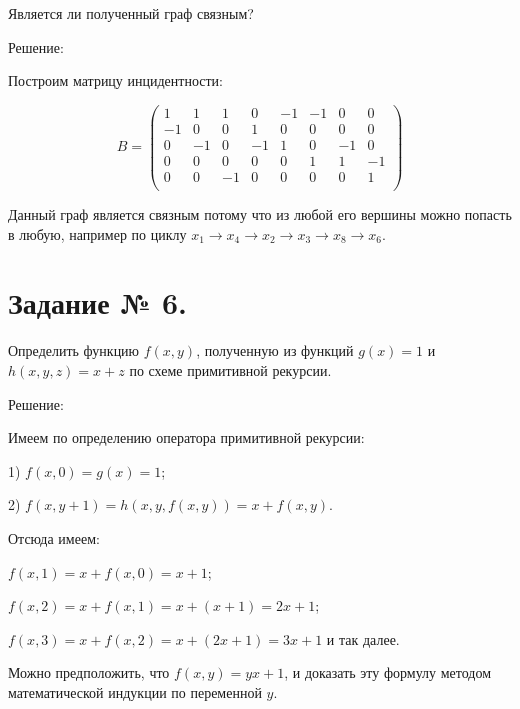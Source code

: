 \documentclass[fleqn]{article}
\begin{document}
Является ли полученный граф связным?

\begin{center}Решение:\end{center}

\medskip
{}
\medskip

Построим матрицу инцидентности:

$$B=
\begin{pmatrix}
1 & 1 & 1 & 0 & -1 & -1 & 0 & 0 \\
-1 & 0 & 0 & 1 & 0 & 0 & 0 & 0 \\
0 & -1 & 0 & -1 & 1 & 0 & -1 & 0 \\
0 & 0 & 0 & 0 & 0 & 1 & 1 & -1 \\
0 & 0 & -1 & 0 & 0 & 0 & 0 & 1 \\
\end{pmatrix}
$$

Данный граф является связным потому что из любой его вершины можно попасть в любую, например по циклу $x_1\to x_4 \to x_2 \to x_3 \to x_8 \to x_6$.

\section*{Задание № 6.}

Определить функцию $f(x,y)$, полученную из функций $g(x) =1$ и
$h(x, y, z) = x+z$ по схеме примитивной рекурсии.

\begin{center}Решение:\end{center}

Имеем по определению оператора примитивной рекурсии:

1) $f(x,0)=g(x)=1$;

2) $f(x,y+1)=h\left(x,y,f(x,y)\right)=x+f(x,y)$.

Отсюда имеем:

$f(x,1)=x+f(x,0)=x+1$;

$f(x,2)=x+f(x,1)=x+(x+1)=2x+1$;

$f(x,3)=x+f(x,2)=x+(2x+1)=3x+1$ и так далее.

Можно предположить, что $f(x,y)=yx+1$, и доказать эту формулу
методом математической индукции по переменной $y$.
\end{document}

